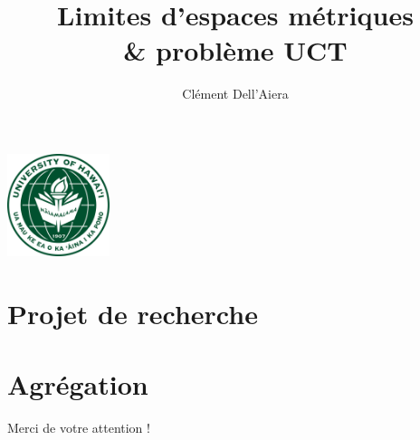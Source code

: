 \documentclass{beamer}
\title[First Steps with SCRATCH]{Limites d'espaces m\'etriques\\ \& probl\`eme UCT}
\author{Clément Dell'Aiera}
\institute{University of Hawai'i at Manoa}
\date{}
\begin{document}
\begin{frame}
\titlepage
\begin{center} \includegraphics[width=3cm]{UH_logo.png}\end{center}
\end{frame}

\begin{frame}
  \tableofcontents\end{frame}

\section{Projet de recherche}


\section{Agr\'egation}
\begin{frame}
  \tableofcontents[currentsection]
\end{frame}


\footnotesize

%
%

\Large
\begin{frame}{}
Merci de votre attention !
\end{frame}
\end{document}

